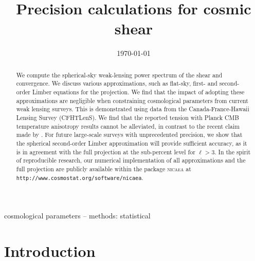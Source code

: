 \documentclass[fleqn,usenatbib]{mnras} %
\title[Precision calculations for cosmic shear]{Precision calculations for cosmic shear}  %
\date{\today}
\begin{document}
\setlength{\voffset}{-12mm}

\label{firstpage}


\maketitle
\begin{abstract}

We compute the spherical-sky weak-lensing power spectrum of the shear and
convergence. We discuss various approximations, such as flat-sky, first- and
second-order Limber equations for the projection. We find that the impact of adopting 
these approximations are negligible when constraining cosmological parameters from 
current weak lensing surveys.
This is demonstrated using data from the Canada-France-Hawaii Lensing Survey (CFHTLenS). 
We find that the reported tension with Planck CMB temperature anisotropy results cannot be alleviated, in
contrast to the recent claim made by \citet{2016arXiv161104954K}. 
For future large-scale surveys with unprecedented precision, we show that the spherical
second-order Limber approximation will provide sufficient accuracy, as it is in 
agreement with the full projection at the sub-percent level for $\ell > 3$.  
In the spirit of reproducible research, our numerical implementation of all approximations
and the full projection are publicly available within the package
\textsc{nicaea} at \texttt{http://www.cosmostat.org/software/nicaea}.

\end{abstract}

\begin{keywords}
cosmological parameters -- methods: statistical
\end{keywords}



\section{Introduction}
\label{sec:intro}
\end{document}
